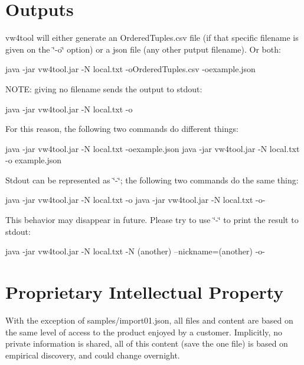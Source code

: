 \section*{Outputs }

vw4tool will either generate an Ordered\+Tuples.\+csv file (if that specific filename is given on the \char`\"{}-\/o\char`\"{} option) or a json file (any other putput filename). Or both\+: \begin{DoxyVerb}java -jar vw4tool.jar  -N local.txt -oOrderedTuples.csv -oexample.json
\end{DoxyVerb}


N\+O\+T\+E\+: giving no filename sends the output to stdout\+: \begin{DoxyVerb}java -jar vw4tool.jar  -N local.txt -o
\end{DoxyVerb}


For this reason, the following two commands do different things\+: \begin{DoxyVerb}java -jar vw4tool.jar  -N local.txt -oexample.json
java -jar vw4tool.jar  -N local.txt -o example.json
\end{DoxyVerb}


Stdout can be represented as \char`\"{}-\/\char`\"{}; the following two commands do the same thing\+: \begin{DoxyVerb}java -jar vw4tool.jar  -N local.txt -o
java -jar vw4tool.jar  -N local.txt -o-
\end{DoxyVerb}


This behavior may disappear in future. Please try to use \char`\"{}-\/\char`\"{} to print the result to stdout\+: \begin{DoxyVerb}java -jar vw4tool.jar  -N local.txt -N (another) --nickname=(another) -o-
\end{DoxyVerb}


\section*{Proprietary Intellectual Property }

With the exception of samples/import01.\+json, all files and content are based on the same level of access to the product enjoyed by a customer. Implicitly, no private information is shared, all of this content (save the one file) is based on empirical discovery, and could change overnight. 